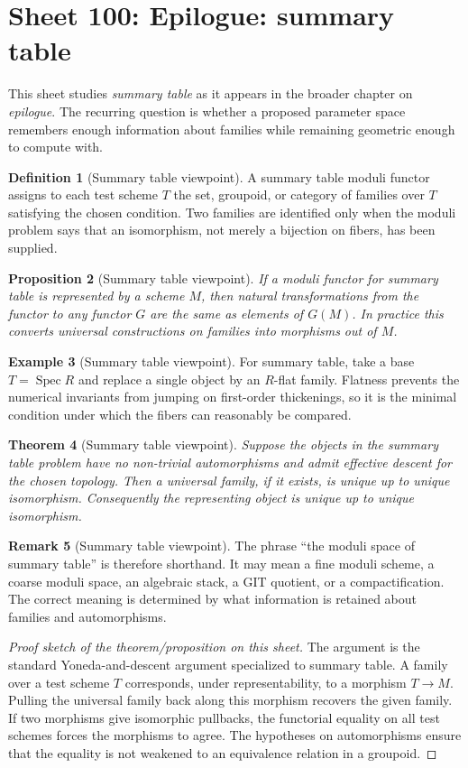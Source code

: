 \documentclass[11pt]{amsart}
\newtheorem{theorem}{Theorem}[section]
\newtheorem{proposition}[theorem]{Proposition}
\theoremstyle{definition}
\newtheorem{definition}[theorem]{Definition}
\newtheorem{example}[theorem]{Example}
\newtheorem{remark}[theorem]{Remark}
\newcommand{\Spec}{\operatorname{Spec}}
\begin{document}
\section{Sheet 100: Epilogue: summary table}
This sheet studies \emph{summary table} as it appears in the broader chapter on \emph{epilogue}.  The recurring question is whether a proposed parameter space remembers enough information about families while remaining geometric enough to compute with.
\begin{definition}[Summary table viewpoint]
A summary table moduli functor assigns to each test scheme $T$ the set, groupoid, or category of families over $T$ satisfying the chosen condition.  Two families are identified only when the moduli problem says that an isomorphism, not merely a bijection on fibers, has been supplied.
\end{definition}
\begin{proposition}[Summary table viewpoint]
If a moduli functor for summary table is represented by a scheme $M$, then natural transformations from the functor to any functor $G$ are the same as elements of $G(M)$.  In practice this converts universal constructions on families into morphisms out of $M$.
\end{proposition}
\begin{example}[Summary table viewpoint]
For summary table, take a base $T=\Spec R$ and replace a single object by an $R$-flat family.  Flatness prevents the numerical invariants from jumping on first-order thickenings, so it is the minimal condition under which the fibers can reasonably be compared.
\end{example}
\begin{theorem}[Summary table viewpoint]
Suppose the objects in the summary table problem have no non-trivial automorphisms and admit effective descent for the chosen topology.  Then a universal family, if it exists, is unique up to unique isomorphism.  Consequently the representing object is unique up to unique isomorphism.
\end{theorem}
\begin{remark}[Summary table viewpoint]
The phrase ``the moduli space of summary table'' is therefore shorthand.  It may mean a fine moduli scheme, a coarse moduli space, an algebraic stack, a GIT quotient, or a compactification.  The correct meaning is determined by what information is retained about families and automorphisms.
\end{remark}
\begin{proof}[Proof sketch of the theorem/proposition on this sheet]
The argument is the standard Yoneda-and-descent argument specialized to summary table.  A family over a test scheme $T$ corresponds, under representability, to a morphism $T\to M$.  Pulling the universal family back along this morphism recovers the given family.  If two morphisms give isomorphic pullbacks, the functorial equality on all test schemes forces the morphisms to agree.  The hypotheses on automorphisms ensure that the equality is not weakened to an equivalence relation in a groupoid.
\end{proof}
\end{document}
